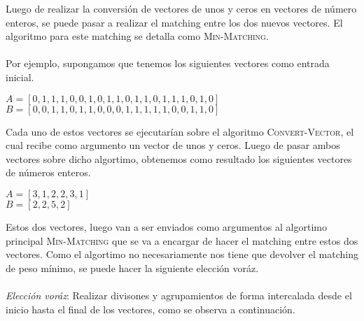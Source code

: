 \documentclass[conference]{IEEEtran}
\begin{document}
Luego de realizar la conversión de vectores de unos y ceros en vectores de número enteros, se puede pasar a realizar el matching entre los dos nuevos vectores. El algoritmo para este matching se detalla como \textsc{Min-Matching}.\\\\
Por ejemplo, supongamos que tenemos los siguientes vectores como entrada inicial.
\begin{center}
    $A=[0,1,1,1,0,0,1,0,1,1,0,1,1,0,1,1,1,0,1,0]$\\
    $B=[0,0,1,1,0,1,1,0,0,0,1,1,1,1,1,0,0,1,1,0]$
\end{center}
Cada uno de estos vectores se ejecutarían sobre el algoritmo \textsc{Convert-Vector}, el cual recibe como argumento un vector de unos y ceros. Luego de pasar ambos vectores sobre dicho algortimo, obtenemos como resultado los siguientes vectores de números enteros.
\begin{center}
    $A=[3,1,2,2,3,1]$\\
    $B=[2,2,5,2]$
\end{center}
Estos dos vectores, luego van a ser enviados como argumentos al algortimo principal \textsc{Min-Matching} que se va a encargar de hacer el matching entre estos dos vectores. Como el algortimo no necesariamente nos tiene que devolver el matching de peso mínimo, se puede hacer la siguiente elección voráz.\\\\
\textit{Elección voráz}: Realizar divisones y agrupamientos de forma intercalada desde el inicio hasta el final de los vectores, como se observa a continuación.\\
\begin{center}
\end{center}
\end{document}

